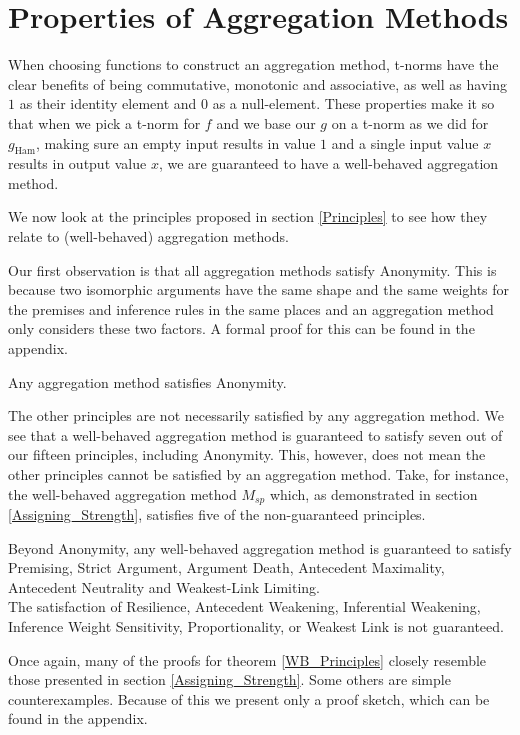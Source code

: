\documentclass[runningheads]{llncs}
\begin{document}
\section{Properties of Aggregation Methods}\label{AM_Properties}
When choosing functions to construct an aggregation method, t-norms have the clear benefits of being commutative, monotonic and  associative, as well as having $1$ as their identity element and $0$ as a null-element. These properties make it so that when we pick a t-norm for $f$ and we base our $g$ on a t-norm as we did for $g_{\text{Ham}}$, making sure an empty input results in value $1$ and a single input value $x$ results in output value $x$, we are guaranteed to have a well-behaved aggregation method.

We now look at the principles proposed in section \ref{Principles} to see how they relate to (well-behaved) aggregation methods.

Our first observation is that all aggregation methods satisfy Anonymity. This is because two isomorphic arguments have the same shape and the same weights for the premises and inference rules in the same places and an aggregation method only considers these two factors. A formal proof for this can be found in the appendix.
\begin{theorem}\label{AM_Anonymity}
Any aggregation method satisfies Anonymity.
\end{theorem}

The other principles are not necessarily satisfied by any aggregation method. We see that a well-behaved aggregation method is guaranteed to satisfy seven out of our fifteen principles, including Anonymity. This, however, does not mean the other principles cannot be satisfied by an aggregation method. Take, for instance, the well-behaved aggregation method $M_{sp}$ which, as demonstrated in section \ref{Assigning_Strength}, satisfies five of the non-guaranteed principles.

\begin{theorem}\label{WB_Principles}
Beyond Anonymity, any well-behaved aggregation method is guaranteed to satisfy Premising, Strict Argument, Argument Death, Antecedent Maximality, Antecedent Neutrality and Weakest-Link Limiting.\\
The satisfaction of Resilience, Antecedent Weakening, Inferential Weakening, Inference Weight Sensitivity, Proportionality, %
or Weakest Link is not guaranteed.
\end{theorem}

Once again, many of the proofs for theorem \ref{WB_Principles} closely resemble those presented in section \ref{Assigning_Strength}. Some others are simple counterexamples. Because of this we present only a proof sketch, which can be found in the appendix.
%
\end{document}
